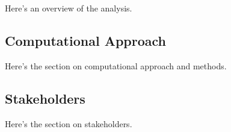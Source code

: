 \documentclass[../Main.tex]{subfiles}
\begin{document}
Here's an overview of the analysis.

\subsection{Computational Approach}

Here's the section on computational approach and methods.

\subsection{Stakeholders}

Here's the section on stakeholders.
\end{document}
